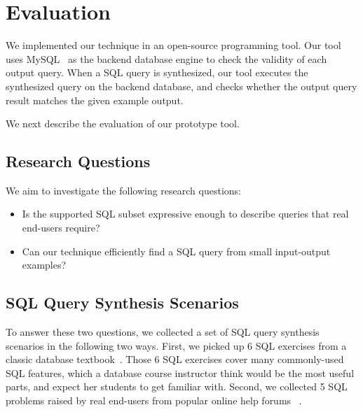 
\section{Evaluation}
\label{sec:evaluation}

We implemented our technique in an open-source programming tool.
Our tool uses MySQL~\cite{mysql} as the backend database engine
to check the validity of each output query.
When a SQL query is synthesized,
our tool executes the synthesized query on the backend database,
and checks whether the output query result matches the given example output.

We next describe the evaluation of our prototype tool.

\subsection{Research Questions}

We aim to investigate the following research questions:

\begin{itemize}
\item Is the supported SQL subset expressive enough to describe
queries that real end-users require?

\item Can our technique efficiently find a SQL query
from small input-output examples?


\end{itemize}


\subsection{SQL Query Synthesis Scenarios}

To answer these two questions, we collected a set
of SQL query synthesis scenarios in the following
two ways. First, we picked
up 6 SQL exercises from a classic database textbook~\cite{cowbook}.
Those 6 SQL exercises cover many commonly-used SQL features,
which a database course instructor think would be the most useful parts,
and expect her students to get familiar with. Second, we collected
5 SQL problems raised by real end-users from popular online help forums
~\cite{stackoverflow, tutorialized, dbjournal}.

